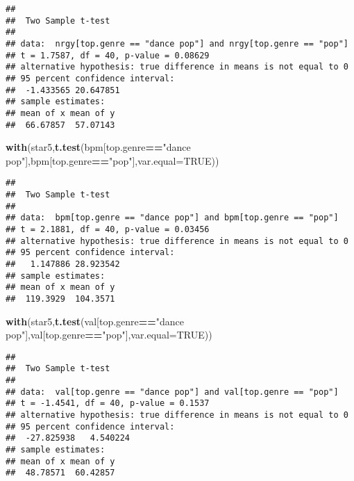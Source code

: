 \documentclass[
]{article}
\newenvironment{Shaded}{\begin{snugshade}}{\end{snugshade}}
\newcommand{\DataTypeTok}[1]{\textcolor[rgb]{0.13,0.29,0.53}{#1}}
\newcommand{\KeywordTok}[1]{\textcolor[rgb]{0.13,0.29,0.53}{\textbf{#1}}}
\newcommand{\NormalTok}[1]{#1}
\newcommand{\OperatorTok}[1]{\textcolor[rgb]{0.81,0.36,0.00}{\textbf{#1}}}
\newcommand{\OtherTok}[1]{\textcolor[rgb]{0.56,0.35,0.01}{#1}}
\newcommand{\StringTok}[1]{\textcolor[rgb]{0.31,0.60,0.02}{#1}}
\begin{document}
\begin{verbatim}
## 
##  Two Sample t-test
## 
## data:  nrgy[top.genre == "dance pop"] and nrgy[top.genre == "pop"]
## t = 1.7587, df = 40, p-value = 0.08629
## alternative hypothesis: true difference in means is not equal to 0
## 95 percent confidence interval:
##  -1.433565 20.647851
## sample estimates:
## mean of x mean of y 
##  66.67857  57.07143
\end{verbatim}

\begin{Shaded}
\begin{Highlighting}[]
\KeywordTok{with}\NormalTok{(star5,}\KeywordTok{t.test}\NormalTok{(bpm[top.genre}\OperatorTok{==}\StringTok{"dance pop"}\NormalTok{],bpm[top.genre}\OperatorTok{==}\StringTok{"pop"}\NormalTok{],}\DataTypeTok{var.equal=}\OtherTok{TRUE}\NormalTok{))}
\end{Highlighting}
\end{Shaded}

\begin{verbatim}
## 
##  Two Sample t-test
## 
## data:  bpm[top.genre == "dance pop"] and bpm[top.genre == "pop"]
## t = 2.1881, df = 40, p-value = 0.03456
## alternative hypothesis: true difference in means is not equal to 0
## 95 percent confidence interval:
##   1.147886 28.923542
## sample estimates:
## mean of x mean of y 
##  119.3929  104.3571
\end{verbatim}

\begin{Shaded}
\begin{Highlighting}[]
\KeywordTok{with}\NormalTok{(star5,}\KeywordTok{t.test}\NormalTok{(val[top.genre}\OperatorTok{==}\StringTok{"dance pop"}\NormalTok{],val[top.genre}\OperatorTok{==}\StringTok{"pop"}\NormalTok{],}\DataTypeTok{var.equal=}\OtherTok{TRUE}\NormalTok{))}
\end{Highlighting}
\end{Shaded}

\begin{verbatim}
## 
##  Two Sample t-test
## 
## data:  val[top.genre == "dance pop"] and val[top.genre == "pop"]
## t = -1.4541, df = 40, p-value = 0.1537
## alternative hypothesis: true difference in means is not equal to 0
## 95 percent confidence interval:
##  -27.825938   4.540224
## sample estimates:
## mean of x mean of y 
##  48.78571  60.42857
\end{verbatim}
\end{document}
